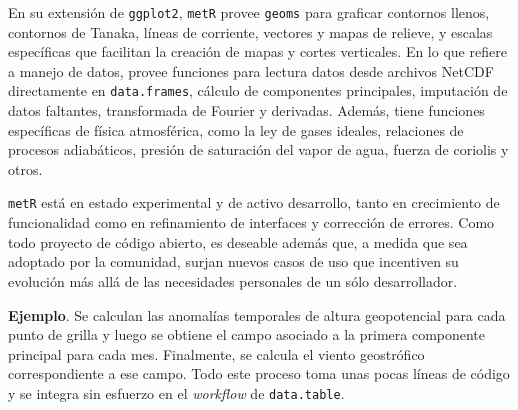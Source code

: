 \documentclass[runningheads,13pt]{llncs}\usepackage{knitr}
\begin{document}
En su extensión de \texttt{ggplot2}, \texttt{metR} provee \texttt{geoms} para graficar contornos llenos, contornos de Tanaka, líneas de corriente, vectores y mapas de relieve, y escalas específicas que facilitan la creación de mapas y cortes verticales. En lo que refiere a manejo de datos, provee funciones para lectura datos desde archivos NetCDF directamente en \texttt{data.frames}, cálculo de componentes principales, imputación de datos faltantes, transformada de Fourier y derivadas. Además, tiene funciones específicas de física atmosférica, como la ley de gases ideales, relaciones de procesos adiabáticos, presión de saturación del vapor de agua, fuerza de coriolis y otros.

\texttt{metR} está en estado experimental y de activo desarrollo, tanto en crecimiento de funcionalidad como en refinamiento de interfaces y corrección de errores. Como todo proyecto de código abierto, es deseable además que, a medida que sea adoptado por la comunidad, surjan nuevos casos de uso que incentiven su evolución más allá de las necesidades personales de un sólo desarrollador.

\textbf{Ejemplo}. Se calculan las anomalías temporales de altura geopotencial para cada punto de grilla y luego se obtiene el campo asociado a la primera componente principal para cada mes. Finalmente, se calcula el viento geostrófico correspondiente a ese campo. Todo este proceso toma unas pocas líneas de código y se integra sin esfuerzo en el \emph{workflow} de \texttt{data.table}. 
\end{document}
